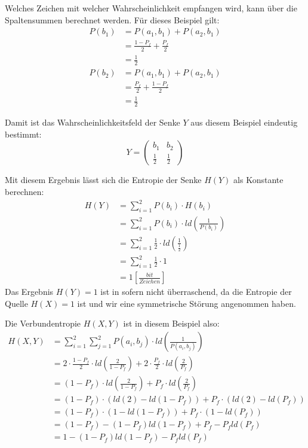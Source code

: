 Welches Zeichen mit welcher Wahrscheinlichkeit empfangen wird,
kann über die Spaltensummen berechnet werden.
Für dieses Beispiel gilt:
\begin{align*}
	P(b_1) &= P(a_1, b_1) + P(a_2, b_1) \\
	           &= \frac{1-P_f}{2} + \frac{P_f}{2} \\
	           &= \frac{1}{2}
\end{align*}
\begin{align*}
	P(b_2) &= P(a_1, b_1) + P(a_2, b_1) \\
	           &= \frac{P_f}{2} +\frac{1-P_f}{2} \\
	           &= \frac{1}{2}
\end{align*}

Damit ist das Wahrscheinlichkeitsfeld der Senke $Y$ aus diesem Beispiel eindeutig bestimmt:
$$
	Y = 
	\left(
	\begin{array}{cc}
		b_1    & b_2 \\
		\frac{1}{2} & \frac{1}{2}
	\end{array}
	\right)
$$

Mit diesem Ergebnis lässt sich die Entropie der Senke $H(Y)$ als Konstante berechnen:
\begin{align*}
	H(Y) &= \sum_{i=1}^2 P(b_i) \cdot H(b_i) \\
		&= \sum_{i=1}^2 P(b_i) \cdot ld \left( \frac{1}{P(b_i)} \right) \\ 
		&= \sum_{i=1}^2 \frac{1}{2} \cdot ld \left( \frac{1}{\frac{1}{2}} \right) \\ 
		&= \sum_{i=1}^2 \frac{1}{2} \cdot 1 \\
		&= 1 \left[ \frac{bit}{Zeichen} \right]
\end{align*}
Das Ergebnis $H(Y) = 1$ ist in sofern nicht überraschend, da die Entropie der Quelle $H(X) = 1$ ist und wir eine symmetrische Störung angenommen haben.

Die Verbundentropie $H(X,Y)$ ist in diesem Beispiel also:
\begin{align*}
	H(X,Y) &= \sum_{i=1}^2\sum_{j=1}^2
		P(a_i,b_j) \cdot ld \left( 
		\frac{1}{P(a_i,b_j)} \right) \\
		   &= 2 \cdot \frac{1-P_f}{2} 
		\cdot ld \left( 
		\frac{2}{1-P_f} \right) 
		+ 2 \cdot \frac{P_f}{2} 
		\cdot ld \left( 
		\frac{2}{P_f} \right)\\
		   &= (1-P_f) \cdot ld \left( 
		\frac{2}{1-P_f} \right) 
		+ P_f	\cdot ld \left( 
		\frac{2}{P_f} \right)\\
		   &= (1-P_f) \cdot (ld(2) - ld(1-P_f)) 
		+ P_f	\cdot (ld(2) - ld(P_f))\\
		   &= (1-P_f) \cdot (1 - ld(1-P_f)) 
		+ P_f	\cdot (1 - ld(P_f))\\
		   &= (1 - P_f) - (1 - P_f)ld(1-P_f) 
		+ P_f - P_fld(P_f)\\
		   &= 1 - (1 - P_f)ld(1-P_f) - P_fld(P_f)
\end{align*}

